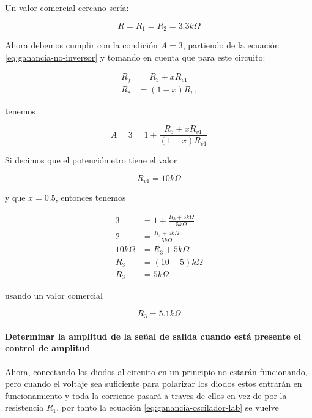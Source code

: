 Un valor comercial cercano sería:

\begin{equation}
    \boxed{R = R_1 = R_2 = 3.3k\Omega}
\end{equation}

Ahora debemos cumplir con la condición $A = 3$, partiendo de la ecuación \ref{eq:ganancia-no-inversor} y tomando en cuenta que para este circuito:

\begin{align}
    R_f &= R_3 + xR_{v1} \\
    R_s &= (1-x) R_{v1}
\end{align}

tenemos

\begin{equation}
    A = 3 = 1 + \frac{R_3 + xR_{v1}}{(1-x)R_{v1}}
    \label{eq:ganancia-oscilador-lab}
\end{equation}

Si decimos que el potenciómetro tiene el valor

\begin{equation}
    \boxed{R_{v1} =  10k\Omega}
\end{equation}

y que $x = 0.5$, entonces tenemos

\begin{align*}
    3 &= 1 + \frac{R_3 + 5k\Omega}{5k\Omega} \\
    2 &= \frac{R_3 + 5k\Omega}{5k\Omega} \\
    10k\Omega &= R_3 + 5k\Omega \\
    R_3 &= (10 - 5)k \Omega \\
    R_3 &= 5 k\Omega
\end{align*}

usando un valor comercial

\begin{equation}
    \boxed{R_3 = 5.1 k\Omega}
\end{equation}

\paragraph{Determinar la amplitud de la señal de salida cuando está presente el control de amplitud\\}

Ahora, conectando los diodos al circuito en un principio no estarán funcionando, pero cuando el voltaje sea suficiente para polarizar los diodos estos entrarán en funcionamiento y toda la corriente pasará a traves de ellos en vez de por la resistencia $R_1$, por tanto la ecuación \ref{eq:ganancia-oscilador-lab} se vuelve

